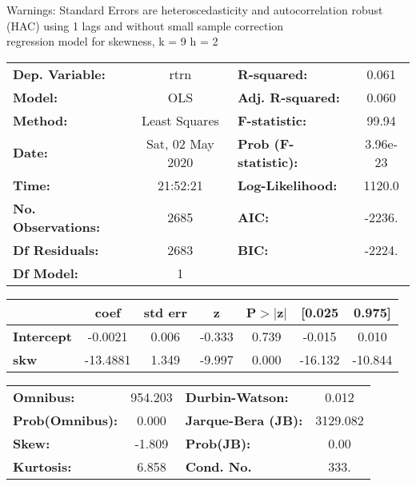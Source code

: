 Warnings: \newline
 [1] Standard Errors are heteroscedasticity and autocorrelation robust (HAC) using 1 lags and without small sample correction\\ 

regression model for skewness, k = 9 h = 2\begin{center}
\begin{tabular}{lclc}
\toprule
\textbf{Dep. Variable:}    &       rtrn       & \textbf{  R-squared:         } &     0.061   \\
\textbf{Model:}            &       OLS        & \textbf{  Adj. R-squared:    } &     0.060   \\
\textbf{Method:}           &  Least Squares   & \textbf{  F-statistic:       } &     99.94   \\
\textbf{Date:}             & Sat, 02 May 2020 & \textbf{  Prob (F-statistic):} &  3.96e-23   \\
\textbf{Time:}             &     21:52:21     & \textbf{  Log-Likelihood:    } &    1120.0   \\
\textbf{No. Observations:} &        2685      & \textbf{  AIC:               } &    -2236.   \\
\textbf{Df Residuals:}     &        2683      & \textbf{  BIC:               } &    -2224.   \\
\textbf{Df Model:}         &           1      & \textbf{                     } &             \\
\bottomrule
\end{tabular}
\begin{tabular}{lcccccc}
                   & \textbf{coef} & \textbf{std err} & \textbf{z} & \textbf{P$> |$z$|$} & \textbf{[0.025} & \textbf{0.975]}  \\
\midrule
\textbf{Intercept} &      -0.0021  &        0.006     &    -0.333  &         0.739        &       -0.015    &        0.010     \\
\textbf{skw}       &     -13.4881  &        1.349     &    -9.997  &         0.000        &      -16.132    &      -10.844     \\
\bottomrule
\end{tabular}
\begin{tabular}{lclc}
\textbf{Omnibus:}       & 954.203 & \textbf{  Durbin-Watson:     } &    0.012  \\
\textbf{Prob(Omnibus):} &   0.000 & \textbf{  Jarque-Bera (JB):  } & 3129.082  \\
\textbf{Skew:}          &  -1.809 & \textbf{  Prob(JB):          } &     0.00  \\
\textbf{Kurtosis:}      &   6.858 & \textbf{  Cond. No.          } &     333.  \\
\bottomrule
\end{tabular}
\end{center}

